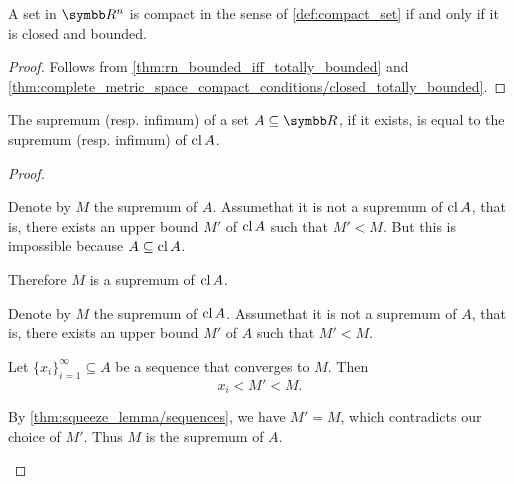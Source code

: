 \begin{theorem}\label{thm:heine_borel}
  A set in \( \R^n \) is compact in the sense of \cref{def:compact_set} if and only if it is closed and bounded.
\end{theorem}
\begin{proof}
  Follows from \cref{thm:rn_bounded_iff_totally_bounded} and \cref{thm:complete_metric_space_compact_conditions/closed_totally_bounded}.
\end{proof}

\begin{proposition}\label{thm:real_supremum_of_closure}
  The supremum (resp. infimum) of a set \( A \subseteq \R \), if it exists, is equal to the supremum (resp. infimum) of \( \operatorname{cl} A \).
\end{proposition}
\begin{proof}
  \begin{description}
    \Implies Denote by \( M \) the supremum of \( A \). Assume\LEM that it is not a supremum of \( \operatorname{cl} A \), that is, there exists an upper bound \( M' \) of \( \operatorname{cl} A \) such that \( M' < M \). But this is impossible because \( A \subseteq \operatorname{cl} A \).

    Therefore \( M \) is a supremum of \( \operatorname{cl} A \).

    \ImpliedBy Denote by \( M \) the supremum of \( \operatorname{cl} A \). Assume\LEM that it is not a supremum of \( A \), that is, there exists an upper bound \( M' \) of \( A \) such that \( M' < M \).

    Let \( \{ x_i \}_{i=1}^\infty \subseteq A \) be a sequence that converges to \( M \). Then
    \begin{equation*}
      x_i < M' < M.
    \end{equation*}

    By \cref{thm:squeeze_lemma/sequences}, we have \( M' = M \), which contradicts our choice of \( M' \). Thus \( M \) is the supremum of \( A \).
  \end{description}
\end{proof}

